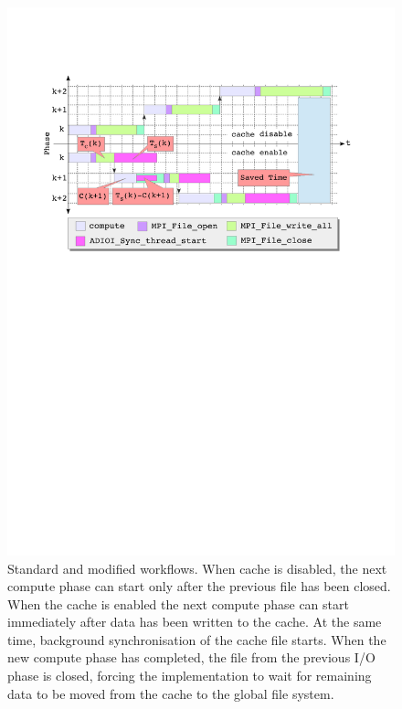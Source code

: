 \begin{figure}[!htb]
  \centering
  \includegraphics[width=0.96\columnwidth]{figures/workflow3}
  \caption{Standard and modified workflows. When cache is disabled, the next compute phase can start only after the previous file has been closed. When the cache is enabled the next compute phase can start immediately after data has been written to the cache. At the same time, background synchronisation of the cache file starts. When the new compute phase has completed, the file from the previous I/O phase is closed, forcing the implementation to wait for remaining data to be moved from the cache to the global file system.}
  \label{figure: workflow3}
\end{figure}

